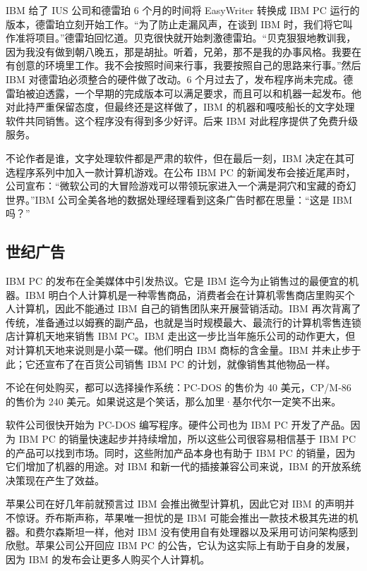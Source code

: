 \documentclass[12pt,UTF8]{ctexbook}
\begin{document}
IBM 给了 IUS 公司和德雷珀 6 个月的时间将 EasyWriter 转换成 IBM PC 运行的版本，德雷珀立刻开始工作。“为了防止走漏风声，在谈到 IBM 时，我们将它叫作准将项目。”德雷珀回忆道。贝克很快就开始刺激德雷珀。“贝克狠狠地教训我，因为我没有做到朝八晚五，那是胡扯。听着，兄弟，那不是我的办事风格。我要在有创意的环境里工作。我不会按照时间来行事，我要按照自己的思路来行事。”然后 IBM 对德雷珀必须整合的硬件做了改动。6 个月过去了，发布程序尚未完成。德雷珀被迫透露，一个早期的完成版本可以满足要求，而且可以和机器一起发布。他对此持严重保留态度，但最终还是这样做了，IBM 的机器和嘎吱船长的文字处理软件共同销售。这个程序没有得到多少好评。后来 IBM 对此程序提供了免费升级服务。

不论作者是谁，文字处理软件都是严肃的软件，但在最后一刻，IBM 决定在其可选程序系列中加入一款计算机游戏。在公布 IBM PC 的新闻发布会接近尾声时，公司宣布：“微软公司的大冒险游戏可以带领玩家进入一个满是洞穴和宝藏的奇幻世界。”IBM 公司全美各地的数据处理经理看到这条广告时都在思量：“这是 IBM 吗？”





\subsection{世纪广告}


IBM PC 的发布在全美媒体中引发热议。它是 IBM 迄今为止销售过的最便宜的机器。IBM 明白个人计算机是一种零售商品，消费者会在计算机零售商店里购买个人计算机，因此不能通过 IBM 自己的销售团队来开展营销活动。IBM 再次背离了传统，准备通过以姆赛的副产品，也就是当时规模最大、最流行的计算机零售连锁店计算机天地来销售 IBM PC。IBM 走出这一步比当年施乐公司的动作更大，但对计算机天地来说则是小菜一碟。他们明白 IBM 商标的含金量。IBM 并未止步于此；它还宣布了在百货公司销售 IBM PC 的计划，就像销售其他物品一样。

不论在何处购买，都可以选择操作系统：PC-DOS 的售价为 40 美元，CP/M-86 的售价为 240 美元。如果说这是个笑话，那么加里·基尔代尔一定笑不出来。

软件公司很快开始为 PC-DOS 编写程序。硬件公司也为 IBM PC 开发了产品。因为 IBM PC 的销量快速起步并持续增加，所以这些公司很容易相信基于 IBM PC 的产品可以找到市场。同时，这些附加产品本身也有助于 IBM PC 的销量，因为它们增加了机器的用途。对 IBM 和新一代的插接兼容公司来说，IBM 的开放系统决策现在产生了效益。

苹果公司在好几年前就预言过 IBM 会推出微型计算机，因此它对 IBM 的声明并不惊讶。乔布斯声称，苹果唯一担忧的是 IBM 可能会推出一款技术极其先进的机器。和费尔森斯坦一样，他对 IBM 没有使用自有处理器以及采用可访问架构感到欣慰。苹果公司公开回应 IBM PC 的公告，它认为这实际上有助于自身的发展，因为 IBM 的发布会让更多人购买个人计算机。
\end{document}
